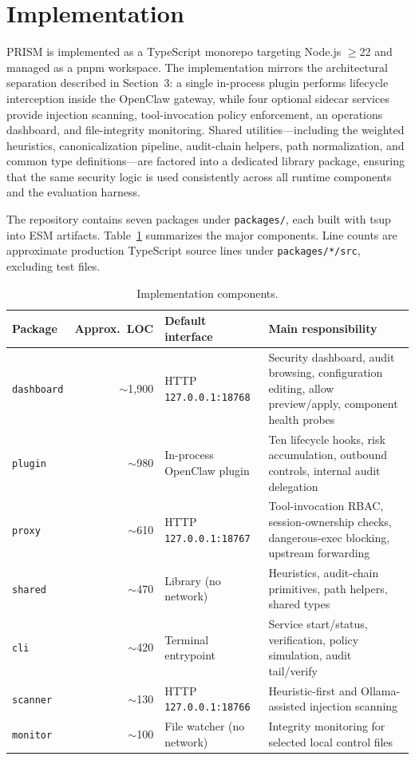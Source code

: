 \section{Implementation}

PRISM is implemented as a TypeScript monorepo targeting Node.js $\geq$22 and managed as a pnpm workspace. The implementation mirrors the architectural separation described in Section~3: a single in-process plugin performs lifecycle interception inside the OpenClaw gateway, while four optional sidecar services provide injection scanning, tool-invocation policy enforcement, an operations dashboard, and file-integrity monitoring. Shared utilities---including the weighted heuristics, canonicalization pipeline, audit-chain helpers, path normalization, and common type definitions---are factored into a dedicated library package, ensuring that the same security logic is used consistently across all runtime components and the evaluation harness.

The repository contains seven packages under \texttt{packages/}, each built with tsup into ESM artifacts. Table~\ref{tab:components} summarizes the major components. Line counts are approximate production TypeScript source lines under \texttt{packages/*/src}, excluding test files.

\begin{table}[ht]
\centering
\small
\begin{tabularx}{\textwidth}{l r l X}
\toprule
Package & Approx.\ LOC & Default interface & Main responsibility \\
\midrule
\texttt{dashboard} & $\sim$1,900 & HTTP \texttt{127.0.0.1:18768} & Security dashboard, audit browsing, configuration editing, allow preview/apply, component health probes \\
\texttt{plugin} & $\sim$980 & In-process OpenClaw plugin & Ten lifecycle hooks, risk accumulation, outbound controls, internal audit delegation \\
\texttt{proxy} & $\sim$610 & HTTP \texttt{127.0.0.1:18767} & Tool-invocation RBAC, session-ownership checks, dangerous-exec blocking, upstream forwarding \\
\texttt{shared} & $\sim$470 & Library (no network) & Heuristics, audit-chain primitives, path helpers, shared types \\
\texttt{cli} & $\sim$420 & Terminal entrypoint & Service start/status, verification, policy simulation, audit tail/verify \\
\texttt{scanner} & $\sim$130 & HTTP \texttt{127.0.0.1:18766} & Heuristic-first and Ollama-assisted injection scanning \\
\texttt{monitor} & $\sim$100 & File watcher (no network) & Integrity monitoring for selected local control files \\
\bottomrule
\end{tabularx}
\caption{Implementation components.}
\label{tab:components}
\end{table}

